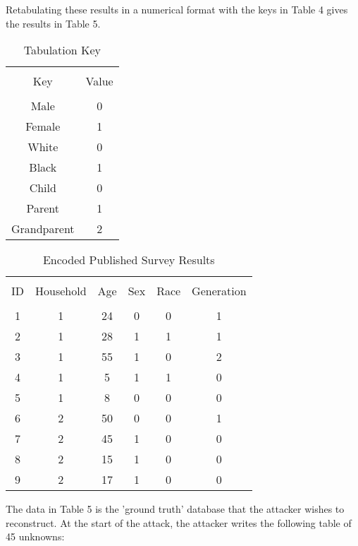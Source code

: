 \documentclass[jou,apacite]{apa6}
\begin{document}
Retabulating these results in a numerical format with the keys in Table 4 gives the results in Table 5.

\begin{table}[!htb]
\caption{Tabulation Key}\label{tab4}
\begin{tabular}{c|c}
\hline\\[-1.5ex]
Key & Value \\[0.5ex]
\hline\\[-1.5ex]
Male & 0 \\[0.5ex]
Female & 1 \\[0.5ex]
White & 0 \\[0.5ex]
Black & 1 \\[0.5ex]
Child & 0 \\[0.5ex]
Parent & 1 \\[0.5ex]
Grandparent & 2 \\[0.5ex]
\hline
\end{tabular}
\end{table}

\begin{table}[!htb]
\caption{Encoded Published Survey Results}\label{tab5}
\begin{tabular}{c|c|c|c|c|c}
\hline\\[-1.5ex]
ID & Household & Age & Sex & Race & Generation \\[0.5ex]
\hline\\[-1.5ex]
1 & 1 & 24 & 0 & 0 & 1  \\[0.5ex]
2 & 1 & 28 & 1 & 1 & 1  \\[0.5ex]
3 & 1 & 55 & 1 & 0 & 2  \\[0.5ex]
4 & 1 & 5 & 1 & 1 & 0  \\[0.5ex]
5 & 1 & 8 & 0 & 0 & 0  \\[0.5ex]
6 & 2 & 50 & 0 & 0 & 1  \\[0.5ex]
7 & 2 & 45 & 1 & 0 & 0  \\[0.5ex]
8 & 2 & 15 & 1 & 0 & 0  \\[0.5ex]
9 & 2 & 17 & 1 & 0 & 0 \\[0.5ex]
\hline
\end{tabular}
\end{table}


The data in Table 5 is the 'ground truth' database that the attacker wishes to reconstruct. At the start of the attack, the attacker writes the following table of 45 unknowns:
\end{document}

